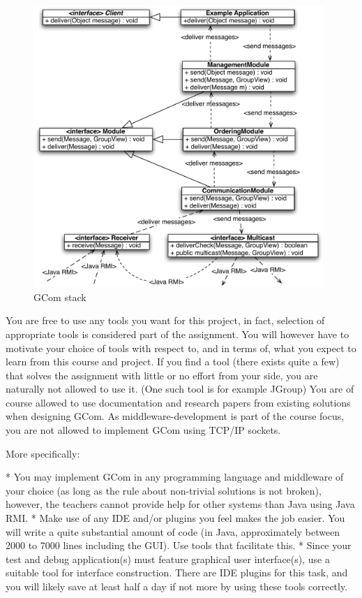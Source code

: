 \documentclass[titlepage, twocolumn, a4paper, 10pt]{article}
\begin{document}
\begin{figure}[!t]
  \centerline{\includegraphics[width=110mm]{images/Stack.pdf}}
  \caption{GCom stack}
  \label{fig:images/Stack}
\end{figure}

You are free to use any tools you want for this project, in fact, selection of appropriate tools is considered part of the assignment. You will however have to motivate your choice of tools with respect to, and in terms of, what you expect to learn from this course and project. If you find a tool (there exists quite a few) that solves the assignment with little or no effort from your side, you are naturally not allowed to use it. (One such tool is for example JGroup) You are of course allowed to use documentation and research papers from existing solutions when designing GCom. As middleware-development is part of the course focus, you are not allowed to implement GCom using TCP/IP sockets.

More specifically:

    * You may implement GCom in any programming language and middleware of your choice (as long as the rule about non-trivial solutions is not broken), however, the teachers cannot provide help for other systems than Java using Java RMI.
    * Make use of any IDE and/or plugins you feel makes the job easier. You will write a quite substantial amount of code (in Java, approximately between 2000 to 7000 lines including the GUI). Use tools that facilitate this.
    * Since your test and debug application(s) must feature graphical user interface(s), use a suitable tool for interface construction. There are IDE plugins for this task, and you will likely save at least half a day if not more by using these tools correctly.
\end{document}
